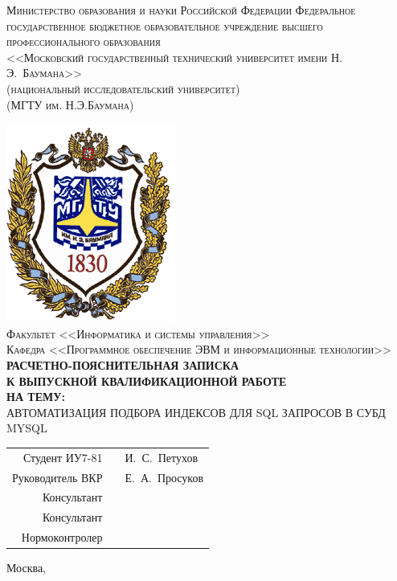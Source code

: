\newcommand{\HRule}{\rule{\linewidth}{0.5mm}}
\fontsize{14}{14pt}\selectfont
\begin{center}

\textsc{
Министерство образования и науки Российской Федерации
Федеральное государственное бюджетное образовательное учреждение 
высшего профессионального образования\\
<<Московский государственный технический университет имени Н.\,Э.~Баумана>>\\
(национальный исследовательский университет)\\
(МГТУ им. Н.Э.Баумана)\\}

\includegraphics[scale=0.5]{inc/img/bmstu-logo.png}\\

\textsc{Факультет <<Информатика и системы управления>>}\\
\textsc{Кафедра <<Программное обеспечение ЭВМ и информационные технологии>>}\\[1cm]

\textsc{\large \bfseries РАСЧЕТНО-ПОЯСНИТЕЛЬНАЯ ЗАПИСКА\\К ВЫПУСКНОЙ КВАЛИФИКАЦИОННОЙ РАБОТЕ\\НА ТЕМУ:}\\[1cm]

\textsc{\large АВТОМАТИЗАЦИЯ ПОДБОРА ИНДЕКСОВ ДЛЯ SQL ЗАПРОСОВ В СУБД MYSQL}

\vfill

\begin{flushright}
  \begin{tabular}{rll}
    Студент ИУ7-81 & \underline{\hspace{6cm}} & И.~С.~Петухов\\[0.5cm]
    Руководитель ВКР & \underline{\hspace{6cm}} & Е.~А.~Просуков\\[0.5cm]
    Консультант & \underline{\hspace{6cm}} & \underline{\hspace{3cm}}\\[0.5cm]
    Консультант & \underline{\hspace{6cm}} & \underline{\hspace{3cm}}\\[0.5cm]
    Нормоконтролер & \underline{\hspace{6cm}} & \underline{\hspace{3cm}}\\[0.5cm]
  \end{tabular}
\end{flushright}

{\large Москва, \the\year}

\end{center}

\newpage
{}